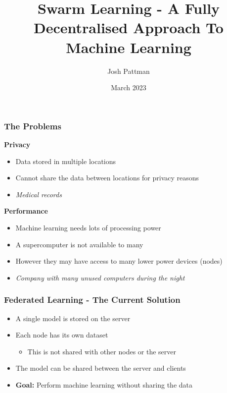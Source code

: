 \documentclass{beamer}
\title{Swarm Learning - A Fully Decentralised Approach To Machine Learning}
\author{Josh Pattman}
\institute{University Of Southampton}
\date{March 2023}
\begin{document}
	\frame{\titlepage}
	
	\begin{frame}
		\frametitle{The Problems}
		\textbf{Privacy}
		\begin{itemize}
			\item Data stored in multiple locations
			\item Cannot share the data between locations for privacy reasons
			\item \emph{Medical records}
		\end{itemize}
		
		\textbf{Performance}
		\begin{itemize}
			\item Machine learning needs lots of processing power
			\item A supercomputer is not available to many
			\item However they may have access to many lower power devices (nodes)
			\item \emph{Company with many unused computers during the night}
		\end{itemize}
	\end{frame}

	\begin{frame}
		\frametitle{Federated Learning - The Current Solution}
		\begin{itemize}
			\item A single model is stored on the server
			\item Each node has its own dataset
			\begin{itemize}
				\item This is not shared with other nodes or the server
			\end{itemize}
			\item The model can be shared between the server and clients
			\item \textbf{Goal:} Perform machine learning without sharing the data
		\end{itemize}
	\end{frame}
\end{document}
